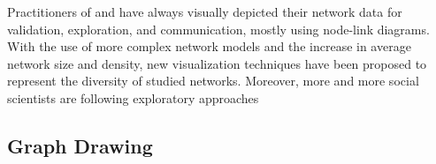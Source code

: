 Practitioners of \sna and \hsna have always visually depicted their network data for validation, exploration, and communication, mostly using node-link diagrams.
With the use of more complex network models and the increase in average network size and density, new visualization techniques have been proposed to represent the diversity of studied networks.
Moreover, more and more social scientists are following exploratory approaches 


\subsection{Graph Drawing}

